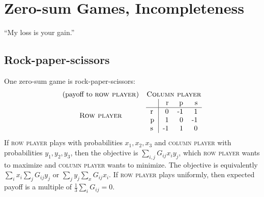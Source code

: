 \chapter{Zero-sum Games, Incompleteness}
``My loss is your gain.''
\section{Rock-paper-scissors}
One zero-sum game is rock-paper-scissors:
	\begin{align}
	\begin{matrix}
	\text{(payoff to \textsc{row player})}& \text{\textsc{Column player}} \\
	\text{\textsc{Row player}} & 
	\begin{tabular}{l|rrrr}
	 & r & p & s \\\hline
	 r & 0 & -1 & 1 \\
	 p & 1 & 0 & -1 \\
	 s & -1 & 1 & 0
	\end{tabular}
	\end{matrix}
	\end{align}
If \textsc{row player} plays with probabilities \(x_1, x_2, x_3\) and \textsc{column player} with probabilities \(y_1, y_2, y_3\), then the objective is 
\(\sum_{i,j} G_{ij}x_iy_j\), which \textsc{row player} wants to maximize and \textsc{column player} wants to minimize.
The objective is equivalently \(\sum_i x_i \sum_j G_{ij}y_j\) 
or \(\sum_j y_j \sum_x G_{ij}x_i\).
If \textsc{row player} plays uniformly, then expected payoff is a multiple of \(\frac{1}{3}\sum_i G_{ij} = 0\).

